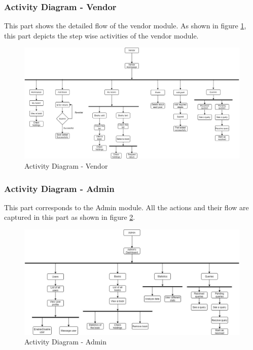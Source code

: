 \documentclass[conference]{IEEEtran}
\begin{document}
 \subsubsection{Activity Diagram - Vendor}
 This part shows the detailed flow of the vendor module. As shown in figure \ref{fig:activitydiagramvendor}, this part depicts the step wise activities of the vendor module.
 \begin{figure}[H]
     \centering
     \includegraphics[scale=0.18,margin=2,frame]{Activity Diagram-Vendor.jpg}
     \caption{Activity Diagram - Vendor}
     \label{fig:activitydiagramvendor}
 \end{figure}
 \subsubsection{Activity Diagram - Admin}
 This part corresponds to the Admin module. All the actions and their flow are captured in this part as shown in figure \ref{fig:activitydiagramadmin}.
 \begin{figure}[h]
     \centering
     \includegraphics[scale=0.18,margin=2,frame]{Activity Diagram-Admin.jpg}
     \caption{Activity Diagram - Admin}
     \label{fig:activitydiagramadmin}
 \end{figure}
\end{document}
